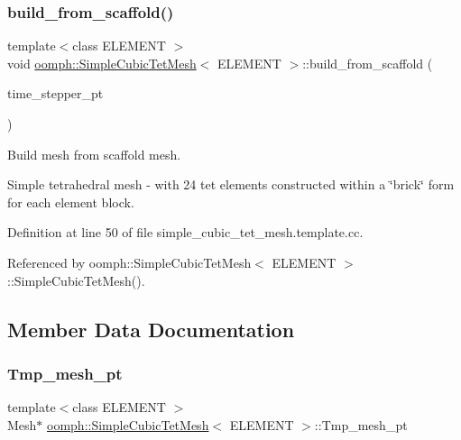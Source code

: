 \subsubsection{\texorpdfstring{build\+\_\+from\+\_\+scaffold()}{build\_from\_scaffold()}}
{\footnotesize\ttfamily template$<$class E\+L\+E\+M\+E\+NT $>$ \\
void \hyperlink{classoomph_1_1SimpleCubicTetMesh}{oomph\+::\+Simple\+Cubic\+Tet\+Mesh}$<$ E\+L\+E\+M\+E\+NT $>$\+::build\+\_\+from\+\_\+scaffold (\begin{DoxyParamCaption}\item[{Time\+Stepper $\ast$}]{time\+\_\+stepper\+\_\+pt }\end{DoxyParamCaption})\hspace{0.3cm}{\ttfamily [private]}}



Build mesh from scaffold mesh. 

Simple tetrahedral mesh -\/ with 24 tet elements constructed within a \char`\"{}brick\char`\"{} form for each element block. 

Definition at line 50 of file simple\+\_\+cubic\+\_\+tet\+\_\+mesh.\+template.\+cc.



Referenced by oomph\+::\+Simple\+Cubic\+Tet\+Mesh$<$ E\+L\+E\+M\+E\+N\+T $>$\+::\+Simple\+Cubic\+Tet\+Mesh().



\subsection{Member Data Documentation}
\mbox{\label{classoomph_1_1SimpleCubicTetMesh_a125fc9ec4d3d74e147ac7f17f867e1a3}} 
\subsubsection{\texorpdfstring{Tmp\+\_\+mesh\+\_\+pt}{Tmp\_mesh\_pt}}
{\footnotesize\ttfamily template$<$class E\+L\+E\+M\+E\+NT $>$ \\
Mesh$\ast$ \hyperlink{classoomph_1_1SimpleCubicTetMesh}{oomph\+::\+Simple\+Cubic\+Tet\+Mesh}$<$ E\+L\+E\+M\+E\+NT $>$\+::Tmp\+\_\+mesh\+\_\+pt\hspace{0.3cm}{\ttfamily [private]}}



